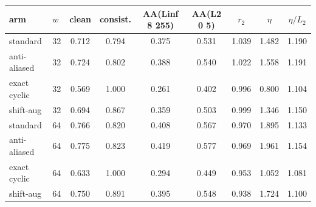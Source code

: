 \begin{tabular}{ll cc cc ccc}
\toprule
arm & $w$ & clean & consist. & AA(Linf 8 255) & AA(L2 0 5) & $r_2$ & $\eta$ & $\eta/L_2$ \\
\midrule
standard & 32 & 0.712 & 0.794 & 0.375 & 0.531 & 1.039 & 1.482 & 1.190 \\
anti-aliased & 32 & 0.724 & 0.802 & 0.388 & 0.540 & 1.022 & 1.558 & 1.191 \\
exact cyclic & 32 & 0.569 & 1.000 & 0.261 & 0.402 & 0.996 & 0.800 & 1.104 \\
shift-aug & 32 & 0.694 & 0.867 & 0.359 & 0.503 & 0.999 & 1.346 & 1.150 \\
\midrule
standard & 64 & 0.766 & 0.820 & 0.408 & 0.567 & 0.970 & 1.895 & 1.133 \\
anti-aliased & 64 & 0.775 & 0.823 & 0.419 & 0.577 & 0.969 & 1.961 & 1.154 \\
exact cyclic & 64 & 0.633 & 1.000 & 0.294 & 0.449 & 0.953 & 1.052 & 1.081 \\
shift-aug & 64 & 0.750 & 0.891 & 0.395 & 0.548 & 0.938 & 1.724 & 1.100 \\
\bottomrule
\end{tabular}